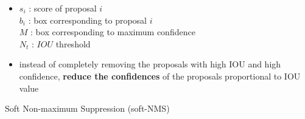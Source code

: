\begin{itemize}
    \item $s_i$ : score of proposal $i$ \\
            $b_i$ : box corresponding to proposal $i$ \\
            $M$ : box corresponding to maximum confidence \\
            $N_t$ : $IOU$ threshold
    
    \item instead of completely removing the proposals with high IOU and high confidence, \textbf{reduce the confidences} of the proposals proportional to IOU value

    
\end{itemize}

\begin{algorithm}[h]
    \caption{Soft Non-maximum Suppression (soft-NMS) \cite{medium/towardsdatascience.com/non-maximum-suppression-nms-93ce178e177c,arxiv/1704.04503-soft-nms}}


\end{algorithm}





